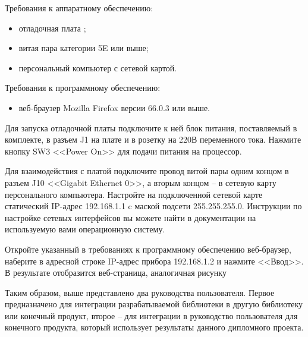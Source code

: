 Требования к аппаратному обеспечению:
\begin{itemize}
    \item отладочная плата ;
    \item витая пара категории 5E или выше;
    \item персональный компьютер с сетевой картой.
\end{itemize}

Требования к программному обеспечению:
\begin{itemize}
    \item веб-браузер Mozilla Firefox версии 66.0.3 или выше.
\end{itemize}

Для запуска отладочной платы подключите к ней блок питания, поставляемый в
комплекте, в разъем J1 на плате и в розетку на 220В переменного тока.
Нажмите кнопку SW3 <<Power On>> для подачи питания на процессор.

Для взаимодействия с платой подключите провод витой пары одним концом в разъем J10
<<Gigabit Ethernet 0>>, а вторым концом -- в сетевую карту персонального компьютера.
Настройте на подключенной сетевой карте статический IP-адрес 192.168.1.1 c
маской подсети 255.255.255.0. Инструкции по настройке сетевых интерфейсов вы можете
найти в документации на используемую вами операционную систему.

Откройте указанный в требованиях к программному обеспечению веб-браузер,
наберите в адресной строке IP-адрес прибора 192.168.1.2 и нажмите <<Ввод>>.
В результате отобразится веб-страница, аналогичная
рисунку%


Таким образом, выше представлено два руководства пользователя. Первое
предназначено для интеграции разрабатываемой библиотеки в другую библиотеку
или конечный продукт, второе -- для интеграции в руководство пользователя для
конечного продукта, который использует результаты данного дипломного проекта.
